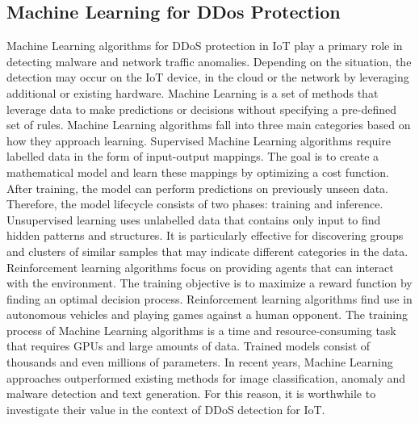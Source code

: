 \documentclass[conference, 11pt]{IEEEtran}
\begin{document}
\subsection{Machine Learning for DDos Protection}
Machine Learning algorithms for DDoS protection in IoT play a primary role in detecting malware and network traffic anomalies.
Depending on the situation, the detection may occur on the IoT device, in the cloud or the network by leveraging additional or existing hardware.
Machine Learning is a set of methods that leverage data to make predictions or decisions without specifying a pre-defined set of rules.
Machine Learning algorithms fall into three main categories based on how they approach learning.
Supervised Machine Learning algorithms require labelled data in the form of input-output mappings.
The goal is to create a mathematical model and learn these mappings by optimizing a cost function.
After training, the model can perform predictions on previously unseen data.
Therefore, the model lifecycle consists of two phases: training and inference.
Unsupervised learning uses unlabelled data that contains only input to find hidden patterns and structures.
It is particularly effective for discovering groups and clusters of similar samples that may indicate different categories in the data.
Reinforcement learning algorithms focus on providing agents that can interact with the environment.
The training objective is to maximize a reward function by finding an optimal decision process.
Reinforcement learning algorithms find use in autonomous vehicles and playing games against a human opponent.
The training process of Machine Learning algorithms is a time and resource-consuming task that requires GPUs and large amounts of data.
Trained models consist of thousands and even millions of parameters.
In recent years, Machine Learning approaches outperformed existing methods for image classification, anomaly and malware detection and text generation.
For this reason, it is worthwhile to investigate their value in the context of DDoS detection for IoT.
\end{document}
